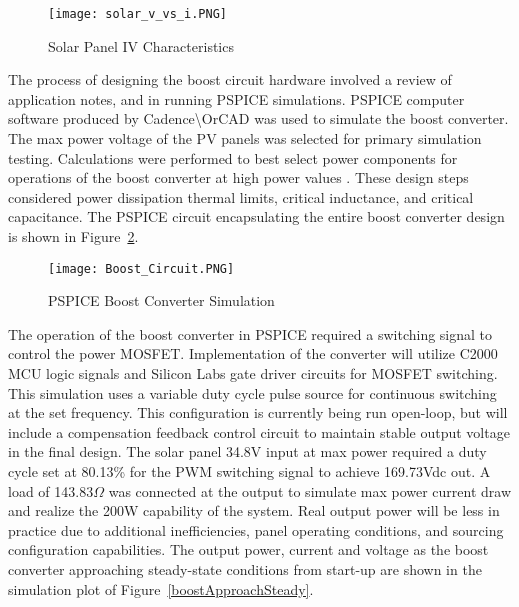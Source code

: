 \begin{figure}
\centering
\texttt{[image: solar\_v\_vs\_i.PNG]}
\caption{Solar Panel IV Characteristics}
\label{panelCharacteristics}
\end{figure}

The process of designing the boost circuit hardware involved a review of application notes, and in running PSPICE simulations. PSPICE computer software  produced by Cadence\textbackslash{}OrCAD was used to simulate the boost converter. The max power voltage  of the PV panels was selected for primary simulation testing. Calculations were performed to best select power components for operations of the boost converter at high power values . These design steps considered power dissipation thermal limits, critical inductance, and critical capacitance. The PSPICE circuit encapsulating the entire boost converter design is shown in Figure~\ref{boostCrct}.

\begin{figure}
\centering
\texttt{[image: Boost\_Circuit.PNG]}
\caption{PSPICE Boost Converter Simulation}
\label{boostCrct}
\end{figure}

The operation of the boost converter in PSPICE required a switching signal to control the power MOSFET. Implementation of the converter will utilize C2000 MCU logic signals and Silicon Labs gate driver circuits for MOSFET switching. This simulation uses a variable duty cycle pulse source  for continuous switching at the set frequency. This configuration is currently being run open-loop, but will include a compensation feedback control circuit to maintain stable output voltage in the final design. The solar panel 34.8V input at max power required a duty cycle set at 80.13\% for the PWM switching signal to achieve 169.73Vdc  out. A load of 143.83$\Omega$ was connected at the output to simulate max power current draw and realize the 200W capability of the system. Real output power will be less in practice due to additional inefficiencies, panel operating conditions, and sourcing configuration capabilities. The output power, current and voltage as the boost converter approaching steady-state conditions from start-up are shown in the simulation plot of Figure~\ref{boostApproachSteady}. 

